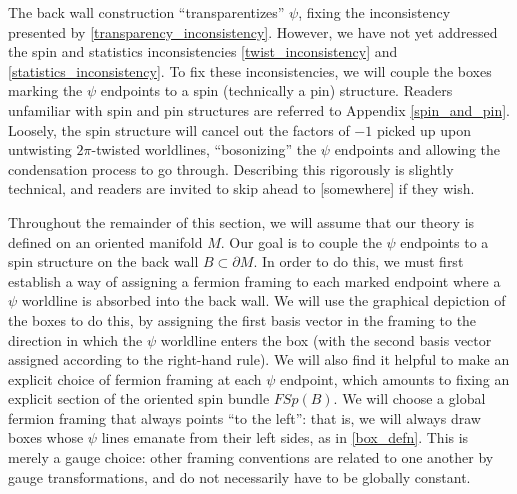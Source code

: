 \documentclass[12pt,a4paper]{article}
\newcommand{\kw}[1]{{\color{kwcolor}\footnotesize{(KW) #1}}}
\begin{document}
The back wall construction ``transparentizes'' $\psi$, fixing the inconsistency presented by \eqref{transparency_inconsistency}. 
However, we have not yet addressed the spin and statistics inconsistencies \eqref{twist_inconsistency} and \eqref{statistics_inconsistency}.
To fix these inconsistencies, we will couple the boxes marking the $\psi$ endpoints to a spin (technically a pin) structure. Readers unfamiliar with spin and pin structures are referred to Appendix \ref{spin_and_pin}. 
Loosely, the spin structure will cancel out the factors of $-1$ picked up upon untwisting $2\pi$-twisted worldlines, ``bosonizing'' the $\psi$ endpoints and allowing the condensation process to go through. Describing this rigorously is slightly technical, and readers are invited to skip ahead to [somewhere] if they wish. 


Throughout the remainder of this section, we will assume that our theory is defined on an oriented manifold $M$. 
Our goal is to couple the $\psi$ endpoints to a spin structure on the back wall $B \subset \partial M$. In order to do this, we must first establish a way of assigning a fermion framing to each marked endpoint where a $\psi$ worldline is absorbed into the back wall. We will use the graphical depiction of the boxes to do this, by assigning the first basis vector in the framing to the direction in which the $\psi$ worldline enters the box (with the second basis vector assigned according to the right-hand rule).
We will also find it helpful to make an explicit choice of fermion framing at each $\psi$ endpoint, which amounts to fixing an explicit section of the oriented spin bundle $FSp(B)$. 
We will choose a global fermion framing that always points ``to the left'': that is, we will always draw boxes whose $\psi$ lines emanate from their left sides, as in \eqref{box_defn}. 
This is merely a gauge choice: other framing conventions are related to one another by gauge transformations, and do not necessarily have to be globally constant. 
\end{document}

